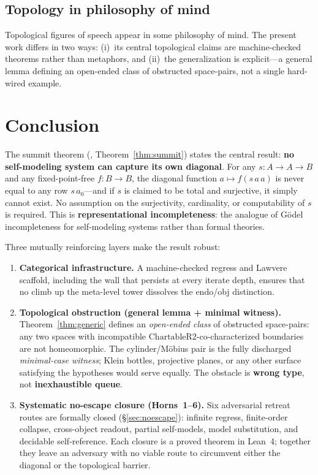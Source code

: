 \documentclass[11pt]{article}
\begin{document}
\subsection{Topology in philosophy of mind}
Topological figures of speech appear in some philosophy of mind.  The present
work differs in two ways: (i)~its central topological claims are machine-checked
theorems rather than metaphors, and (ii)~the generalization is explicit---a
general lemma defining an open-ended class of obstructed space-pairs, not a
single hard-wired example.

\section{Conclusion}
\label{sec:conclusion}

The summit theorem (,
Theorem~\ref{thm:summit}) states the central result:
\textbf{no self-modeling system can capture its own diagonal}.  For any
$s : A \to A \to B$ and any fixed-point-free $f : B \to B$, the
diagonal function $a \mapsto f(s\,a\,a)$ is never equal to any row
$s\,a_0$---and if $s$ is claimed to be total and surjective, it simply
cannot exist.  No assumption on the surjectivity, cardinality, or
computability of $s$ is required.  This is
\textbf{representational incompleteness}: the analogue of G\"odel
incompleteness for self-modeling systems rather than formal theories.

Three mutually reinforcing layers make the result robust:

\begin{enumerate}[label=(\roman*)]
\item \textbf{Categorical infrastructure.}\enspace
  A machine-checked regress and Lawvere scaffold, including the
   wall that persists at every iterate
  depth, ensures that no climb up the meta-level tower dissolves the
  endo/obj distinction.
\item \textbf{Topological obstruction (general lemma + minimal witness).}\enspace
  Theorem~\ref{thm:generic} defines an \emph{open-ended class} of
  obstructed space-pairs: any two spaces with incompatible
  $\mathrm{ChartableR2}$-co-characterized boundaries are not
  homeomorphic.  The cylinder/M\"obius pair is the fully discharged
  \emph{minimal-case witness}; Klein bottles, projective planes, or
  any other surface satisfying the hypotheses would serve equally.
  The obstacle is \textbf{wrong type}, not
  \textbf{inexhaustible queue}.
\item \textbf{Systematic no-escape closure (Horns~1--6).}\enspace
  Six adversarial retreat routes are formally closed
  (\S\ref{sec:noescape}): infinite regress, finite-order collapse,
  cross-object readout, partial self-models, model substitution, and
  decidable self-reference.  Each closure is a proved theorem in
  Lean~4; together they leave an adversary with no viable route to
  circumvent either the diagonal or the topological barrier.
\end{enumerate}
\end{document}
